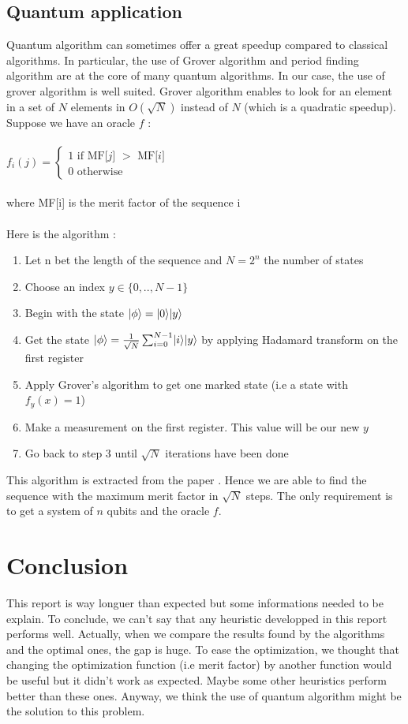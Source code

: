 \documentclass[a4paper,11pt,openany]{article}
\begin{document}
\subsection{Quantum application}
\DeclarePairedDelimiter\bra{\langle}{\rvert}
\DeclarePairedDelimiter\ket{\lvert}{\rangle}
\noindent
Quantum algorithm can sometimes offer a great speedup compared to classical algorithms. In particular, the use of Grover algorithm \cite{search} and period finding algorithm are at the core of many quantum algorithms. In our case, the use of grover algorithm is well suited. Grover algorithm enables to look for an element in a set of $N$ elements in $O(\sqrt{N})$ instead of $N$ (which is a quadratic speedup).
Suppose we have an oracle $f$ :\\\\
$f_i(j)=\left\{
\begin{array}{l}
  1 \text{ if MF[$j$] $>$ MF[$i$]} \\
  0 \text{ otherwise}
\end{array}
\right.$\\\\
where MF[i] is the merit factor of the sequence i\\\\
Here is the algorithm :
\begin{enumerate}
\item Let n bet the length of the sequence and $N=2^n$ the number of states
\item Choose an index $y \in \{0,..,N-1\}$
\item Begin with the state $\ket{\phi}=\ket{0}\ket{y}$
\item Get the state $\ket{\phi}=\frac{1}{\sqrt{N}}\sum_{i=0}^{N-1}\ket{i}\ket{y}$ by applying Hadamard transform on the first register
\item Apply Grover's algorithm to get one marked state (i.e a state with $f_y(x)=1$)
\item Make a measurement on the first register. This value will be our new $y$
\item Go back to step 3 until $\sqrt{N}$ iterations have been done
\end{enumerate}
This algorithm is extracted from the paper \cite{max_quantum}. Hence we are able to find the sequence with the maximum merit factor in $\sqrt{N}$ steps. The only requirement is to get a system of $n$ qubits and the oracle $f$.
\section{Conclusion}
This report is way longuer than expected but some informations needed to be explain. To conclude, we can't say that any heuristic developped in this report performs well. Actually, when we compare the results found by the algorithms and the optimal ones, the gap is huge. To ease the optimization, we thought that changing the optimization function (i.e merit factor) by another function would be useful but it didn't work as expected. Maybe some other heuristics perform better than these ones. Anyway, we think the use of quantum algorithm might be the solution to this problem.
\end{document}
